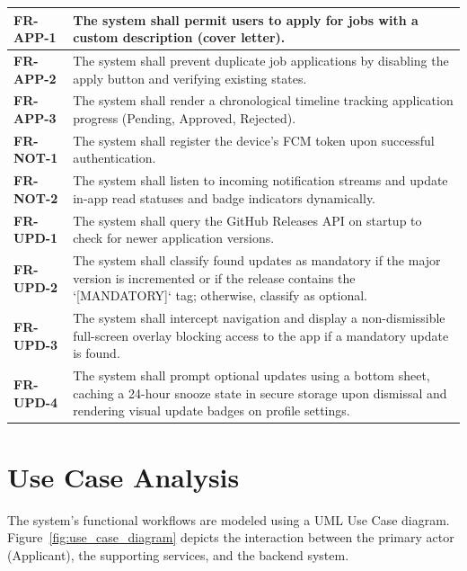 \begin{table}[htbp]
\begin{tabular}{|l|p{10cm}|}
\textbf{FR-APP-1}  & The system shall permit users to apply for jobs with a custom description (cover letter). \\ \hline
\textbf{FR-APP-2}  & The system shall prevent duplicate job applications by disabling the apply button and verifying existing states. \\ \hline
\textbf{FR-APP-3}  & The system shall render a chronological timeline tracking application progress (Pending, Approved, Rejected). \\ \hline
\textbf{FR-NOT-1}  & The system shall register the device's FCM token upon successful authentication. \\ \hline
\textbf{FR-NOT-2}  & The system shall listen to incoming notification streams and update in-app read statuses and badge indicators dynamically. \\ \hline
\textbf{FR-UPD-1}  & The system shall query the GitHub Releases API on startup to check for newer application versions. \\ \hline
\textbf{FR-UPD-2}  & The system shall classify found updates as mandatory if the major version is incremented or if the release contains the `[MANDATORY]` tag; otherwise, classify as optional. \\ \hline
\textbf{FR-UPD-3}  & The system shall intercept navigation and display a non-dismissible full-screen overlay blocking access to the app if a mandatory update is found. \\ \hline
\textbf{FR-UPD-4}  & The system shall prompt optional updates using a bottom sheet, caching a 24-hour snooze state in secure storage upon dismissal and rendering visual update badges on profile settings. \\ \hline
\end{tabular}
\end{table}

\section{Use Case Analysis}
The system's functional workflows are modeled using a UML Use Case diagram. Figure~\ref{fig:use_case_diagram} depicts the interaction between the primary actor (Applicant), the supporting services, and the backend system.

